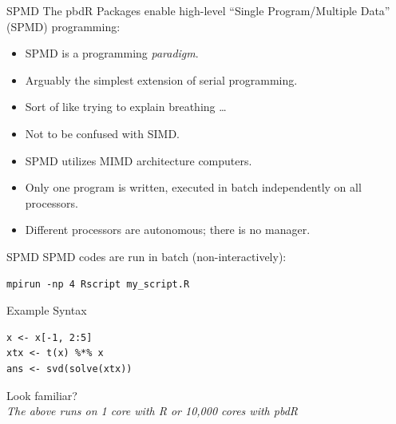 \begin{frame}
  \begin{block}{SPMD}\pause
  The pbdR Packages enable high-level ``Single Program/Multiple Data'' (SPMD) programming:
    \begin{itemize}
      \item SPMD is a programming \emph{paradigm}.
      \item Arguably the simplest extension of serial programming.
      \item Sort of like trying to explain breathing \dots
      \item Not to be confused with SIMD.
      \item SPMD utilizes MIMD architecture computers.
      \item Only one program is written, executed in batch independently on all processors.
      \item Different processors are autonomous; there is no manager.
    \end{itemize}
  \end{block}
\end{frame}


\begin{frame}[fragile]
  \begin{block}{SPMD}\pause
      SPMD codes are run in batch (non-interactively):
\begin{lstlisting}[backgroundcolor=\color{white},keywordstyle=\color{black},title=From the Shell]
mpirun -np 4 Rscript my_script.R
\end{lstlisting}
  \end{block}
\end{frame}


\begin{frame}[fragile]
  \begin{block}{Example Syntax}\pause
  \begin{lstlisting}
x <- x[-1, 2:5]
xtx <- t(x) %*% x
ans <- svd(solve(xtx))
  \end{lstlisting}
  \begin{center}
  \pause Look familiar?\\[.4cm] \pause
  \emph{The above runs on 1 core with R or 10,000 cores with pbdR}
  \end{center}
  \end{block}
\end{frame}



